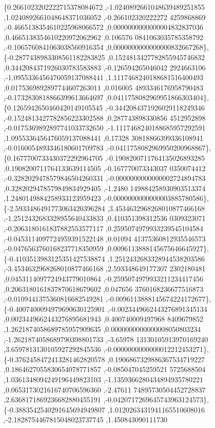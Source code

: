 \begin{DoxyCode}
\{0.2661023202222715378084672 ,-1.0240892661048639489251855 ,1.0240892661048648371036052 ,-0.266102320222272
      4259868869 ,-0.4665138354610225968066572 ,0.0000000000000004832837036 ,0.4665138354610220972062962 ,0.106576
      0841063035785358792 ,-0.1065760841063038560916354 ,0.0000000000000000832667268\},
\{-0.2877438983308561182283825 ,0.1524813427782855945746832 ,0.3442084371926030783583883 ,-0.126594265046042
      2924663106 ,-1.0955336456476059137088441 ,1.1117468240188681516400493 ,0.0175369892897744607263011 ,0.016005
      4893346176958790483 ,-0.1732830818866399613664697 ,0.0411758082969951866303404\},
\{0.1265942650460420149105545 ,-0.3442084371926029118249346 ,-0.1524813427782856223302588 ,0.287743898330856
      4512952898 ,-0.0175369892897741033732650 ,-1.1117468240188685957292591 ,1.0955336456476059137088441 ,0.17328
      30818866399336108941 ,-0.0160054893346180601709783 ,-0.0411758082969950200968867\},
\{0.1677700733430372292964705 ,-0.1908200711764135026893285 ,0.1908200711764133639114505 ,-0.167770073343037
      0350074412 ,-0.3282029478579846504260331 ,-0.0000000000000002724894783 ,0.3282029478579849834929405 ,-1.2480
      149884258930903513374 ,1.2480149884258933123959423 ,-0.0000000000000003885780586\},
\{-2.5933486491773063420396284 ,3.4534632968268010877466168 ,-1.2512432683328955640433833 ,0.410351398312536
      0309323071 ,-0.2063180161837882553577117 ,0.2595074979933239545104584 ,-0.0453114097724959391522148 ,0.01094
      41375360812935546573 ,-0.0476563760168237718350959 ,0.0096113888145675646645927\},
\{-0.4103513983125351427538874 ,1.2512432683328944538203586 ,-3.4534632968268010877466168 ,2.593348649177307
      2302180481 ,0.0453114097724943779010864 ,-0.2595074979933211234417456 ,0.2063180161837870618679602 ,0.047656
      3760168236677516873 ,-0.0109441375360816682549281 ,-0.0096113888145674224172677\},
\{-0.4007400094979690630125901 ,-0.0023449662443276891345134 ,0.0023449662443276895681943 ,0.400740009497968
      8409679852 ,1.2621874058689785957909635 ,0.0000000000000008050803234 ,-1.2621874058689790398801733 ,-3.65978
      13130105913970169240 ,3.6597813130105927292845536 ,-0.0000000000000012212453271\},
\{-0.3762458472413281462820578 ,0.1906867329886367534719227 ,0.1864627055830654078771857 ,-0.085047045259521
      5725688504 ,1.0361348094249196449823103 ,-1.1359366280434894935780221 ,0.0653173021616740706596360 ,-2.47611
      74895730504452728837 ,2.6368171869236682880455191 ,-0.0420717269645743963124573\},
\{-0.3883542540291645694949807 ,1.0120263431941165510608016 ,-2.1828754467815048023737745 ,1.450843090111730

\end{DoxyCode}
